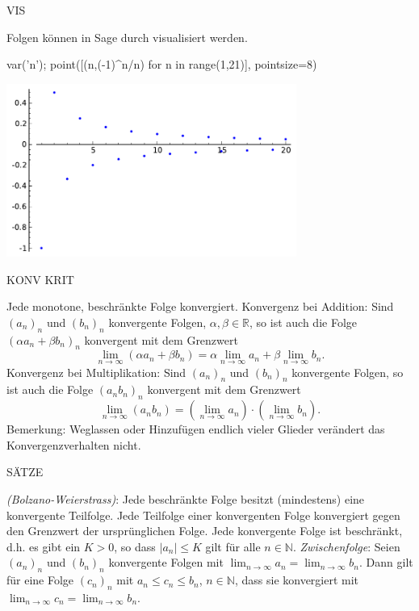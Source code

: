 \documentclass[fontsize=12pt,paper=a4,twoside,bibtotoc,idxtotoc,
liststotoc,pagesize,BCOR1.2cm,DIV15,chapterprefix,pagesize=pdftex]{scrbook}
\theoremstyle{plain}
\theoremstyle{definition}
\theoremstyle{remark}
\begin{document}
VIS

Folgen können in Sage durch {\color{blue} } visualisiert werden.
\begin{sagein}
var('n');
point([(n,(-1)^n/n) for n in range(1,21)], pointsize=8)
\end{sagein}
\begin{center}
\includegraphics[width=9.5cm]{folge.pdf}
\end{center}

KONV KRIT


 Jede monotone, beschränkte Folge konvergiert.
 Konvergenz bei Addition: Sind $(a_n)_n$ und $(b_n)_n$ konvergente Folgen, $\alpha, \beta \in \mathbb{R}$, so ist auch die
                   Folge $( \alpha a_n+\beta b_n)_n$ konvergent mit
                   dem Grenzwert
 \[ \lim_{n \rightarrow \infty} ( \alpha a_n + \beta b_n)= \alpha
                   \lim_{n \rightarrow \infty} a_n + \beta \lim_{n
                   \rightarrow \infty} b_n .\]
 Konvergenz bei Multiplikation: Sind $(a_n)_n$ und $(b_n)_n$ konvergente Folgen, so ist auch die
                   Folge $(a_n b_n)_n$ konvergent mit
                   dem Grenzwert
 \[
  \lim_{n \rightarrow \infty} ( a_n b_n)= 
                   (\lim_{n \rightarrow \infty} a_n) \cdot  (\lim_{n
                   \rightarrow \infty} b_n).
 \]
 Bemerkung: Weglassen oder Hinzufügen endlich vieler Glieder verändert das
                   Konvergenzverhalten nicht.


SÄTZE


 \emph{(Bolzano-Weierstrass)}: Jede beschränkte Folge besitzt (mindestens) eine
konvergente Teilfolge.
 Jede Teilfolge einer konvergenten Folge konvergiert gegen den
Grenzwert der ursprünglichen Folge.
 Jede konvergente Folge ist beschränkt, d.h. es gibt ein $K>0$,
so dass $|a_n|\leq K$ gilt für alle $n \in \mathbb{N}$.
 \emph{Zwischenfolge}: Seien $(a_n)_n$ und $(b_n)_n$ konvergente Folgen mit $\lim_{n
\rightarrow \infty} a_n = \lim_{n \rightarrow \infty} b_n$. Dann gilt
für eine Folge $(c_n)_n$ mit $a_n \leq c_n \leq b_n$, $n \in
\mathbb{N}$, dass sie konvergiert mit  $\lim_{n
\rightarrow \infty} c_n = \lim_{n \rightarrow \infty} b_n$.
\end{document}
